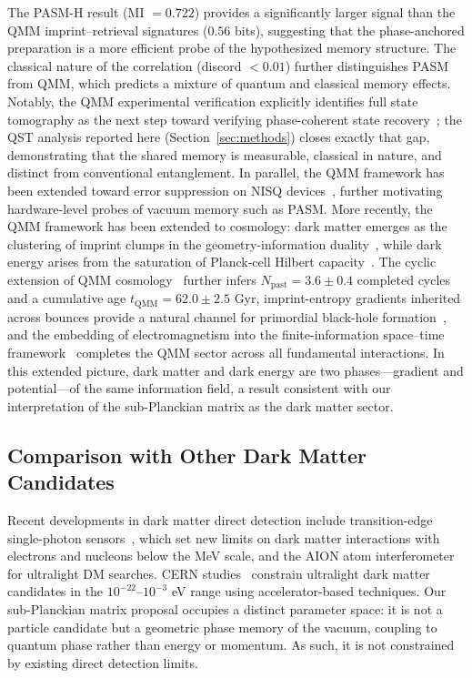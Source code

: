 ﻿\documentclass[12pt,a4paper]{article}
\begin{document}
The PASM-H result (MI $= 0.722$) provides a significantly larger signal than the QMM imprint--retrieval signatures ($0.56$ bits), suggesting that the phase-anchored preparation is a more efficient probe of the hypothesized memory structure. The classical nature of the correlation (discord $< 0.01$) further distinguishes PASM from QMM, which predicts a mixture of quantum and classical memory effects. Notably, the QMM experimental verification explicitly identifies full state tomography as the next step toward verifying phase-coherent state recovery~\cite{neukart2026qip}; the QST analysis reported here (Section~\ref{sec:methods}) closes exactly that gap, demonstrating that the shared memory is measurable, classical in nature, and distinct from conventional entanglement. In parallel, the QMM framework has been extended toward error suppression on NISQ devices~\cite{neukart2026qec}, further motivating hardware-level probes of vacuum memory such as PASM. More recently, the QMM framework has been extended to cosmology: dark matter emerges as the clustering of imprint clumps in the geometry-information duality~\cite{neukart2025dm}, while dark energy arises from the saturation of Planck-cell Hilbert capacity~\cite{neukart2025de}. The cyclic extension of QMM cosmology~\cite{neukart2025cycle} further infers $N_{\mathrm{past}} = 3.6 \pm 0.4$ completed cycles and a cumulative age $t_{\mathrm{QMM}} = 62.0 \pm 2.5$ Gyr, imprint-entropy gradients inherited across bounces provide a natural channel for primordial black-hole formation~\cite{neukart2025pbh}, and the embedding of electromagnetism into the finite-information space--time framework~\cite{neukart2026em} completes the QMM sector across all fundamental interactions. In this extended picture, dark matter and dark energy are two phases---gradient and potential---of the same information field, a result consistent with our interpretation of the sub-Planckian matrix as the dark matter sector.

\subsection{Comparison with Other Dark Matter Candidates}

Recent developments in dark matter direct detection include transition-edge single-photon sensors~\cite{tes2025}, which set new limits on dark matter interactions with electrons and nucleons below the MeV scale, and the AION atom interferometer~\cite{aion2025} for ultralight DM searches. CERN studies~\cite{cern2025} constrain ultralight dark matter candidates in the $10^{-22}$--$10^{-3}$ eV range using accelerator-based techniques. Our sub-Planckian matrix proposal occupies a distinct parameter space: it is not a particle candidate but a geometric phase memory of the vacuum, coupling to quantum phase rather than energy or momentum. As such, it is not constrained by existing direct detection limits.
\end{document}
